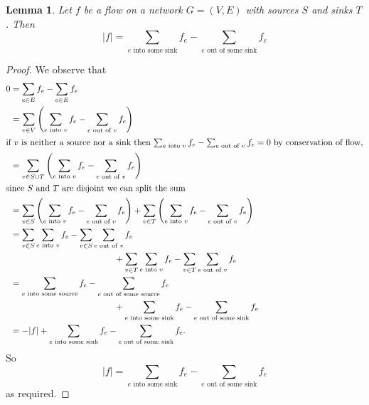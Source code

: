 \documentclass[12pt]{article}
\newtheorem{Lemma}{Lemma}
\begin{document}
\begin{Lemma}
    Let $f$ be a flow on a network $G = (V, E)$ with sources $S$ and sinks $T$. Then
    \[
        |f| = \sum_{e \text{ into some sink}} f_e- \sum_{e \text{ out of some sink}}f_e
    \]
\end{Lemma}
\begin{proof}
    We observe that
    \begin{align*}
        0 & = \sum_{e\in E}f_e - \sum_{e \in E}f_e                                                                                                                                    \\
          & = \sum_{v\in V}\left(\sum_{e\text{ into }v}f_e - \sum_{e\text{ out of }v}f_e \right)                                                                                      \\
        \intertext{if $v$ is neither a source nor a sink then $\sum_{e\text{ into }v}f_e - \sum_{e\text{ out of }v}f_e = 0$ by conservation of flow,}
          & = \sum_{v\in S\cup T}\left(\sum_{e\text{ into }v}f_e - \sum_{e\text{ out of }v}f_e \right)                                                                                \\
        \intertext{since $S$ and $T$ are disjoint we can split the sum}
          & = \sum_{v\in S}\left(\sum_{e\text{ into }v}f_e - \sum_{e\text{ out of }v}f_e \right) + \sum_{v\in T}\left(\sum_{e\text{ into }v}f_e - \sum_{e\text{ out of }v}f_e \right) \\
          & = \sum_{v\in S}\sum_{e\text{ into }v}f_e - \sum_{v\in S}\sum_{e\text{ out of }v}f_e                                                                                       \\
          & \qquad \qquad \qquad \qquad \qquad \qquad + \sum_{v\in T}\sum_{e\text{ into }v}f_e - \sum_{v\in T}\sum_{e\text{ out of }v}f_e                                             \\
          & = \sum_{e \text{ into some source}}f_e - \sum_{e \text{ out of some source}}f_e                                                                                           \\
          & \qquad \qquad \qquad \qquad \qquad \qquad + \sum_{e \text{ into some sink}}f_e - \sum_{e \text{ out of some sink}}f_e                                                     \\
          & = -|f| + \sum_{e \text{ into some sink}}f_e - \sum_{e \text{ out of some sink}}f_e.
    \end{align*}
    So
    \[
        |f| = \sum_{e \text{ into some sink}} f_e- \sum_{e \text{ out of some sink}}f_e
    \]
    as required.
\end{proof}
\end{document}
